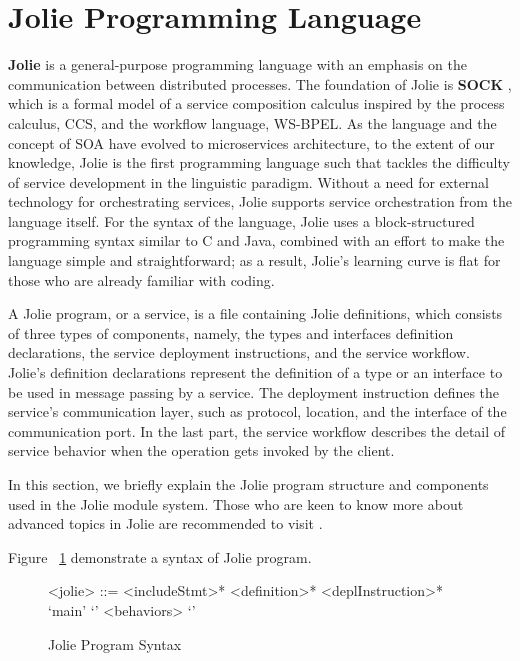 \section{Jolie Programming Language}

\textbf{Jolie}\cite{JOLIE} is a general-purpose programming language with an emphasis on the communication between distributed processes. The foundation of Jolie is \textbf{SOCK} \cite{10.1007/11948148-27}, which is a formal model of a service composition calculus inspired by the process calculus, CCS\cite{10.5555/539036}, and the workflow language, WS-BPEL\cite{OASIS}.
As the language and the concept of SOA have evolved to microservices architecture, to the extent of our knowledge, Jolie is the first programming language such that tackles the difficulty of service development in the linguistic paradigm\cite{DBLP:journals/corr/GuidiLMM17}.
Without a need for external technology for orchestrating services, Jolie supports service orchestration from the language itself.
For the syntax of the language, Jolie uses a block-structured programming syntax similar to C and Java, combined with an effort to make the language simple and straightforward; as a result, Jolie's learning curve is flat for those who are already familiar with coding.

A Jolie program, or a service, is a file containing Jolie definitions, which consists of three types of components, namely, the types and interfaces definition declarations, the service deployment instructions, and the service workflow. Jolie's definition declarations represent the definition of a type or an interface to be used in message passing by a service. The deployment instruction defines the service's communication layer, such as protocol, location, and the interface of the communication port. In the last part, the service workflow describes the detail of service behavior when the operation gets invoked by the client.

In this section, we briefly explain the Jolie program structure and components used in the Jolie module system. Those who are keen to know more about advanced topics in Jolie are recommended to visit \cite{joliedoc, JOLIE}.

Figure ~\ref{fig:JolieGrammar} demonstrate a syntax of Jolie program.

\begin{figure}[h]
    \begin{framed}
        \begin{grammar}
            <jolie> ::= <includeStmt>* <definition>* <deplInstruction>*  `main' `{' <behaviors> `}'
        \end{grammar}
    \end{framed}
    \caption{Jolie Program Syntax}
    \label{fig:JolieGrammar}
\end{figure}

